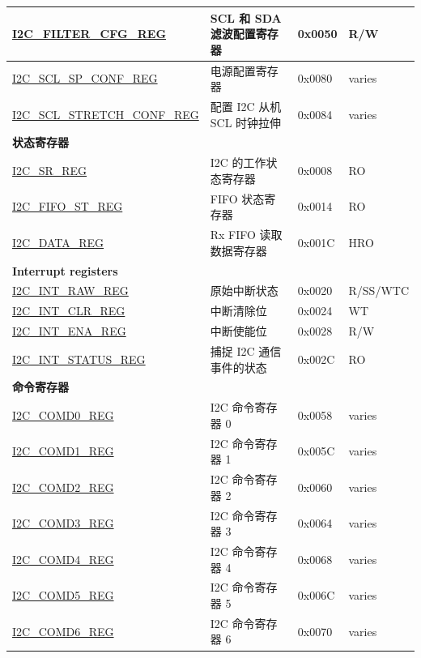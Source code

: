 \begin{longtable}{ | p{6cm} | p{7cm} | p{1.3cm} | p{1cm} | }
\hyperref[regdesc:I2CFILTERCFGREG]{I2C\_FILTER\_CFG\_REG} & SCL 和 SDA 滤波配置寄存器 & 0x0050 & R/W \\ \hline
\hyperref[regdesc:I2CSCLSPCONFREG]{I2C\_SCL\_SP\_CONF\_REG} & 电源配置寄存器 & 0x0080 & varies \\ \hline
\hyperref[regdesc:I2CSCLSTRETCHCONFREG]{I2C\_SCL\_STRETCH\_CONF\_REG} & 配置 I2C 从机 SCL 时钟拉伸 & 0x0084 & varies \\ \hline
\multicolumn{4}{|l|}{\textbf{状态寄存器}} \\ \hline
\hyperref[regdesc:I2CSRREG]{I2C\_SR\_REG} & I2C 的工作状态寄存器 & 0x0008 & RO \\ \hline
\hyperref[regdesc:I2CFIFOSTREG]{I2C\_FIFO\_ST\_REG} & FIFO 状态寄存器 & 0x0014 & RO \\ \hline
\hyperref[regdesc:I2CDATAREG]{I2C\_DATA\_REG} & Rx FIFO 读取数据寄存器 & 0x001C & HRO \\ \hline
\multicolumn{4}{|l|}{\textbf{Interrupt registers}} \\ \hline
\hyperref[regdesc:I2CINTRAWREG]{I2C\_INT\_RAW\_REG} & 原始中断状态 & 0x0020 & R/SS/WTC \\ \hline
\hyperref[regdesc:I2CINTCLRREG]{I2C\_INT\_CLR\_REG} & 中断清除位 & 0x0024 & WT \\ \hline
\hyperref[regdesc:I2CINTENAREG]{I2C\_INT\_ENA\_REG} & 中断使能位 & 0x0028 & R/W \\ \hline
\hyperref[regdesc:I2CINTSTATUSREG]{I2C\_INT\_STATUS\_REG} & 捕捉 I2C 通信事件的状态 & 0x002C & RO \\ \hline
\multicolumn{4}{|l|}{\textbf{命令寄存器}} \\ \hline
\hyperref[regdesc:I2CCOMD0REG]{I2C\_COMD0\_REG} & I2C 命令寄存器 0 & 0x0058 & varies \\ \hline
\hyperref[regdesc:I2CCOMD1REG]{I2C\_COMD1\_REG} & I2C 命令寄存器 1 & 0x005C & varies \\ \hline
\hyperref[regdesc:I2CCOMD2REG]{I2C\_COMD2\_REG} & I2C 命令寄存器 2 & 0x0060 & varies \\ \hline
\hyperref[regdesc:I2CCOMD3REG]{I2C\_COMD3\_REG} & I2C 命令寄存器 3 & 0x0064 & varies \\ \hline
\hyperref[regdesc:I2CCOMD4REG]{I2C\_COMD4\_REG} & I2C 命令寄存器 4 & 0x0068 & varies \\ \hline
\hyperref[regdesc:I2CCOMD5REG]{I2C\_COMD5\_REG} & I2C 命令寄存器 5 & 0x006C & varies \\ \hline
\hyperref[regdesc:I2CCOMD6REG]{I2C\_COMD6\_REG} & I2C 命令寄存器 6 & 0x0070 & varies \\ \hline

\end{longtable}
